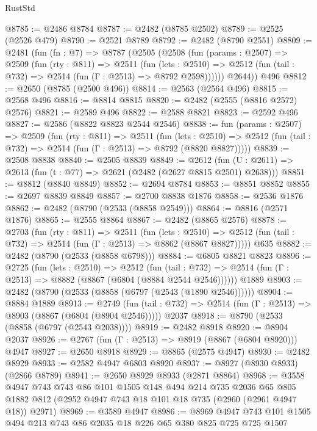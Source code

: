 \begin{lexlean}{RustStd}
\begin{coremodule}
@8785 := @2486 @8784
@8787 := @2482 (@8785 @2502)
@8789 := @2525 (@2526 @479)
@8790 := @2521 @8789
@8792 := @2482 (@8790 @2551)
@8809 := @2481
    (fun (fn : @7) =>
    @8787
      (@2505
        (@2508
          (fun (params : @2507) =>
          @2509
            (fun (rty : @811) =>
            @2511
              (fun (lets : @2510) =>
              @2512 (fun (tail : @732) => @2514 (fun (Γ : @2513) => @8792 @2598))))))
        @2644))
    @496
@8812 := @2650 (@8785 (@2500 @496))
@8814 := @2563 (@2564 @496)
@8815 := @2568 @496
@8816 := @8814 @8815
@8820 := @2482 (@2555 (@8816 @2572) @2576)
@8821 := @2589 @496
@8822 := @2588 @8821
@8823 := @2592 @496
@8827 := @2586 (@8822 @8823 @2544 @2546)
@8838 := fun (params : @2507) =>
  @2509
    (fun (rty : @811) =>
    @2511
      (fun (lets : @2510) =>
      @2512 (fun (tail : @732) => @2514 (fun (Γ : @2513) => @8792 (@8820 @8827)))))
@8839 := @2508 @8838
@8840 := @2505 @8839
@8849 := @2612 (fun (U : @2611) => @2613 (fun (t : @77) => @2621 (@2482 (@2627 @8815 @2501) @2638)))
@8851 := @8812 (@8840 @8849)
@8852 := @2694 @8784
@8853 := @8851 @8852
@8855 := @2697 @8839 @8849
@8857 := @2700 @8838 @1876
@8858 := @2536 @1876
@8862 := @2482 (@8790 (@2533 (@8858 @2549)))
@8864 := @8816 (@2571 @1876)
@8865 := @2555 @8864
@8867 := @2482 (@8865 @2576)
@8878 := @2703
    (fun (rty : @811) =>
    @2511
      (fun (lets : @2510) =>
      @2512 (fun (tail : @732) => @2514 (fun (Γ : @2513) => @8862 (@8867 @8827)))))
    @635
@8882 := @2482 (@8790 (@2533 (@8858 @6798)))
@8884 := @6805 @8821 @8823
@8896 := @2725
    (fun (lets : @2510) =>
    @2512
      (fun (tail : @732) => @2514 (fun (Γ : @2513) => @8882 (@8867 (@6804 (@8884 @2544 @2546))))))
    @1889
@8903 := @2482 (@8790 (@2533 (@8858 (@6797 (@2543 (@1890 @2546))))))
@8904 := @8884 @1889
@8913 := @2749
    (fun (tail : @732) => @2514 (fun (Γ : @2513) => @8903 (@8867 (@6804 (@8904 @2546)))))
    @2037
@8918 := @8790 (@2533 (@8858 (@6797 (@2543 @2038))))
@8919 := @2482 @8918
@8920 := @8904 @2037
@8926 := @2767 (fun (Γ : @2513) => @8919 (@8867 (@6804 @8920))) @4947
@8927 := @2650 @8918
@8929 := @8865 (@2575 @4947)
@8930 := @2482 @8929
@8933 := @2582 @4947 @6803 @8920
@8937 := @8927 (@8930 @8933) (@2866 @8789)
@8941 := @2650 @8929 @8933 (@2871 @8864)
@8968 := @3558
    @4947
    @743
    @743
    @86
    @101
    @1505
    @148
    @494
    @214
    @735
    @2036
    @65
    @805
    @1882
    @812
    (@2952 @4947 @743 @18 @101 @18 @735 (@2960 (@2961 @4947 @18)) @2971)
@8969 := @3589 @4947
@8986 := @8969 @4947 @743 @101 @1505 @494 @213 @743 @86 @2035 @18 @226 @65 @380 @825 @725 @725 @1507

\end{coremodule}
\end{lexlean}
